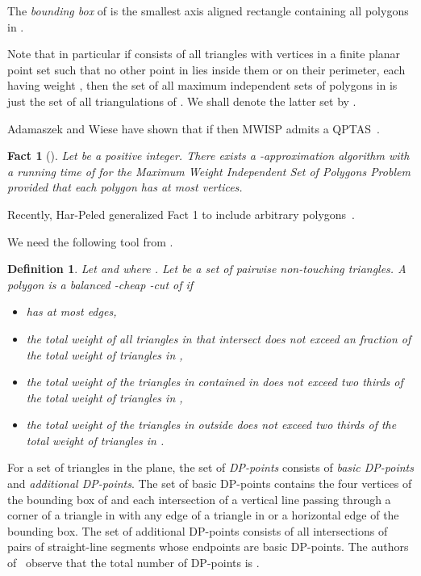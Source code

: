 \documentclass[a4paper]{article}
\newtheorem{definition}{Definition}
\newtheorem{fact}{Fact}
\begin{document}
The \emph{bounding box} of  is the smallest
axis aligned rectangle containing all polygons
in .

Note that in particular if 
 consists of all triangles with vertices
in a finite planar point set  such that
no other point in  lies inside them or
on their perimeter, each having weight ,
then the set of all maximum independent
sets of polygons in  is just the set
of all triangulations of . We shall denote
the latter set by . 


Adamaszek and Wiese have shown that if 
then MWISP admits a QPTAS~\cite{AW14}.
\begin{fact}[\cite{AW14}] Let  be a positive integer.
There exists a -approximation
algorithm with a running time of 
for the Maximum Weight Independent Set of Polygons Problem provided
that each polygon has at most  vertices.
\end{fact}
Recently, Har-Peled generalized Fact 1 to include arbitrary
polygons~\cite{H14}.

We need the following tool from  \cite{AW14}.

\begin{definition}
Let  and  where .
Let  be a set of pairwise non-touching triangles.
A polygon   is a balanced -cheap
-cut of  if
\begin{itemize}
\item  has at most  edges,
\item the total weight of all triangles
in  that intersect 
does not exceed an  fraction
of the total weight of triangles in ,
\item 
the total weight of the triangles in 
contained in  does not
exceed two thirds of the total weight
of triangles in ,
\item 
the total weight of the triangles in 
outside  does not
exceed  two thirds of the total weight
of triangles in .
\end{itemize}
\end{definition}

For a set of triangles  in the plane,
the set of \emph{DP-points} consists
of \emph{basic DP-points} and \emph{additional DP-points}.
The set of basic DP-points contains
the four vertices of the bounding box
of  and each intersection of
a vertical line passing through a corner
of a triangle in  with any edge
of a triangle in  or a horizontal
edge of the bounding box.
The set of additional DP-points 
consists of all intersections of
pairs of straight-line segments whose
endpoints are basic DP-points.
The authors of~\cite{AW14} observe that
the total number of DP-points is .
\end{document}
